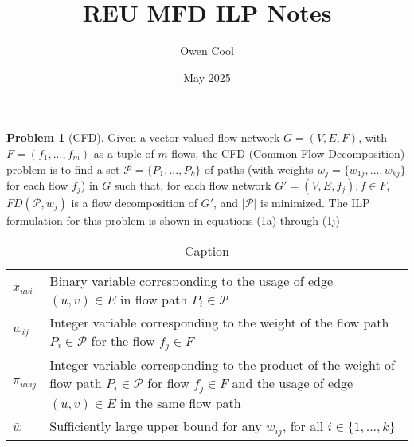\documentclass{article}
\title{REU MFD ILP Notes}
\author{Owen Cool}
\date{May 2025}
\begin{document}
\maketitle

\textbf{Problem 1} (CFD). Given a vector-valued flow network $G=(V,E,F)$, with $F=(f_1,...,f_m)$ as a tuple of $m$ flows, the CFD (Common Flow Decomposition) problem is to find a set $\mathcal{P}=\{P_1,...,P_k\}$ of paths (with weights $w_j=\{w_{1j},...,w_{kj}\}$ for each flow $f_j$) in $G$ such that, for each flow network $G'=(V,E,f_j), f\in F$, $FD(\mathcal{P},w_j)$ is a flow decomposition of $G'$, and $|\mathcal{P}|$ is minimized. The ILP formulation for this problem is shown in equations (1a) through (1j)

\begin{table}
    \centering
    \renewcommand{\arraystretch}{1.5}
    \begin{tabular}{ | m{2.5em} | m{10cm} | }
         \hline
         & \\
         \hline
         $x_{uvi}$ & Binary variable corresponding to the usage of edge $(u,v)\in E$ in flow path $P_i\in\mathcal{P}$ \\
         $w_{ij}$ & Integer variable corresponding to the weight of the flow path $P_i\in\mathcal{P}$ for the flow $f_j\in F$\\
         $\pi_{uvij}$ & Integer variable corresponding to the product of the weight of flow path $P_i\in\mathcal{P}$ for flow $f_j\in F$ and the usage of edge $(u,v)\in E$ in the same flow path\\
         $\bar{w}$ & Sufficiently large upper bound for any $w_{ij}$, for all $i\in\{1,...,k\}$\\
         \hline
    \end{tabular}
    \caption{Caption}
    \label{tab:my_label}
\end{table}
\end{document}
